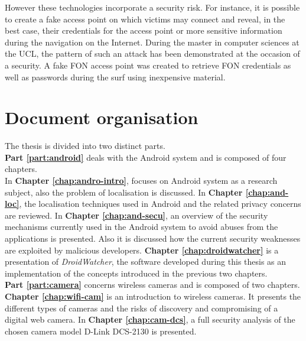 However these technologies incorporate a security risk.
For instance, it is possible to create a fake access point on which victims may connect and reveal, in the best case, their credentials for the access point or more sensitive information during the navigation on the Internet. During the master in computer sciences at the UCL, the pattern of such an attack has been demonstrated at the occasion of a security. A fake FON access point was created to retrieve FON credentials as well as passwords during the surf using inexpensive material.

\section*{Document organisation}

The thesis is divided into two distinct parts.\\

\textbf{Part \ref{part:android}} deals with the Android system and is composed of four chapters.\\

In \textbf{Chapter \ref{chap:andro-intro}}, focuses on Android system as a research subject, also the problem of localisation is discussed. 
In \textbf{Chapter \ref{chap:and-loc}}, the localisation techniques used in Android and the related privacy concerns are reviewed.
In \textbf{Chapter \ref{chap:and-secu}}, an overview of the security mechanisms currently used in the Android system to avoid abuses from the applications is presented.
Also it is discussed how the current security weaknesses are exploited by malicious developers.
\textbf{Chapter \ref{chap:droidwatcher}} is a presentation of \emph{DroidWatcher}, the software developed during this thesis as an implementation of the concepts introduced in the previous two chapters.\\

\textbf{Part \ref{part:camera}} concerns wireless cameras and is composed of two chapters.\\

\textbf{Chapter \ref{chap:wifi-cam}} is an introduction to wireless cameras.
It presents the different types of cameras and the risks of discovery and compromising of a digital web camera.
In \textbf{Chapter \ref{chap:cam-dcs}}, a full security analysis of the chosen camera model D-Link DCS-2130 is presented.\\

